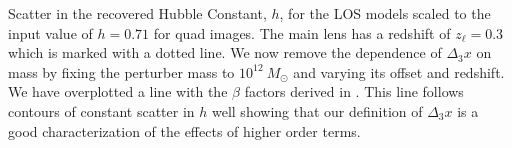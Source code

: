 \label{toyh} Scatter in the recovered Hubble Constant, $h$, for the LOS models scaled to the input value of $h=0.71$ for quad images. The main lens has a redshift of $z_\ell = 0.3$ which is marked with a dotted line. We now remove the dependence of $\Delta_3 x$ on mass by fixing the perturber mass to $10^{12}~ M_\odot$ and varying its offset and redshift. We have overplotted a line with the $\beta$ factors derived in . This line follows contours of constant scatter in $h$ well showing that our definition of $\Delta_3 x$ is a good characterization of the effects of higher order terms. 